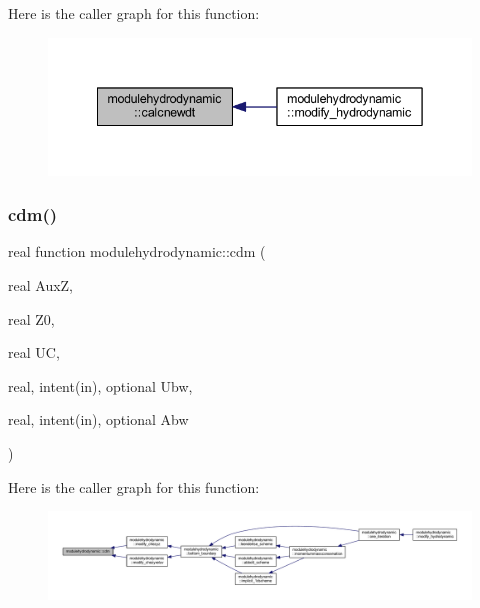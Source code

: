 Here is the caller graph for this function\+:\nopagebreak
\begin{figure}[H]
\begin{center}
\leavevmode
\includegraphics[width=342pt]{namespacemodulehydrodynamic_a63b7d9d86f7746faae381352cdb4ceda_icgraph}
\end{center}
\end{figure}
\mbox{\label{namespacemodulehydrodynamic_a5465756a3c0bc0b2789b8cbffd16ec64}} 
\subsubsection{\texorpdfstring{cdm()}{cdm()}}
{\footnotesize\ttfamily real function modulehydrodynamic\+::cdm (\begin{DoxyParamCaption}\item[{real}]{AuxZ,  }\item[{real}]{Z0,  }\item[{real}]{UC,  }\item[{real, intent(in), optional}]{Ubw,  }\item[{real, intent(in), optional}]{Abw }\end{DoxyParamCaption})\hspace{0.3cm}{\ttfamily [private]}}

Here is the caller graph for this function\+:\nopagebreak
\begin{figure}[H]
\begin{center}
\leavevmode
\includegraphics[width=350pt]{namespacemodulehydrodynamic_a5465756a3c0bc0b2789b8cbffd16ec64_icgraph}
\end{center}
\end{figure}
\mbox{\label{namespacemodulehydrodynamic_a7bcb9032bfe7bf84ef03ab8c66f0f159}} 
